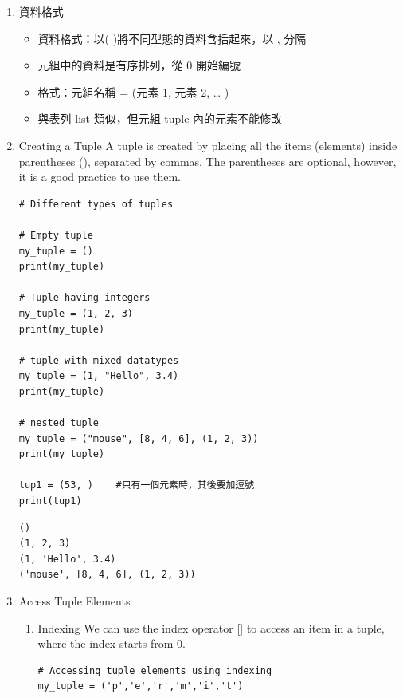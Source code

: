 \documentclass[a4paper,12pt]{article}
\begin{document}
\begin{enumerate}
\item 資料格式
\label{sec:org449d11c}
\begin{itemize}
\item 資料格式：以( )將不同型態的資料含括起來，以 , 分隔\\
\item 元組中的資料是有序排列，從 0 開始編號\\
\item 格式：元組名稱 = (元素 1, 元素 2, … )\\
\item 與表列 list 類似，但元組 tuple 內的元素不能修改\\
\end{itemize}

\item Creating a Tuple
\label{sec:org7c42758}
A tuple is created by placing all the items (elements) inside parentheses (), separated by commas. The parentheses are optional, however, it is a good practice to use them.\\
\lstset{breaklines=true,language=Python,label= ,caption= ,captionpos=b,firstnumber=1,numbers=left}
\begin{lstlisting}
# Different types of tuples

# Empty tuple
my_tuple = ()
print(my_tuple)

# Tuple having integers
my_tuple = (1, 2, 3)
print(my_tuple)

# tuple with mixed datatypes
my_tuple = (1, "Hello", 3.4)
print(my_tuple)

# nested tuple
my_tuple = ("mouse", [8, 4, 6], (1, 2, 3))
print(my_tuple)

tup1 = (53, )    #只有一個元素時，其後要加逗號
print(tup1)

\end{lstlisting}

\begin{verbatim}
()
(1, 2, 3)
(1, 'Hello', 3.4)
('mouse', [8, 4, 6], (1, 2, 3))
\end{verbatim}

\item Access Tuple Elements
\label{sec:org9b07e3a}
\begin{enumerate}
\item Indexing
\label{sec:orga81d1ed}
We can use the index operator [] to access an item in a tuple, where the index starts from 0.\\
\lstset{breaklines=true,language=Python,label= ,caption= ,captionpos=b,firstnumber=1,numbers=left}
\begin{lstlisting}
# Accessing tuple elements using indexing
my_tuple = ('p','e','r','m','i','t')


\end{lstlisting}
\end{enumerate}
\end{enumerate}
\end{document}
